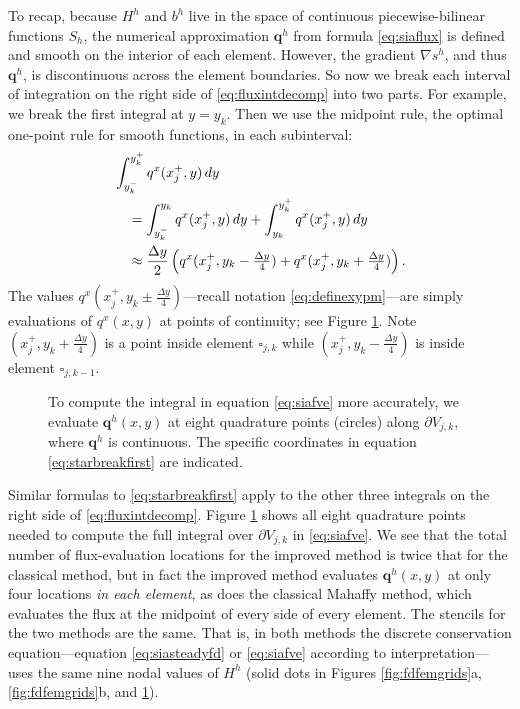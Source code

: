 \documentclass[twocolumn,letterpaper]{igs}
\newcommand\bq{\mathbf{q}}
\newcommand{\grad}{\nabla}
\begin{document}
To recap, because $H^h$ and $b^h$ live in the space of continuous piecewise-bilinear functions $S_h$, the numerical approximation $\bq^h$ from formula \eqref{eq:siaflux} is defined and smooth on the interior of each element.  However, the gradient $\grad s^h$, and thus $\bq^h$, is discontinuous across the element boundaries.  So now we break each interval of integration on the right side of \eqref{eq:fluxintdecomp} into two parts.  For example, we break the first integral at $y=y_k$.  Then we use the midpoint rule, the optimal one-point rule for smooth functions, in each subinterval:
\begin{align}
&\int_{y_k^-}^{y_k^+} q^x(x_j^+,y)\,dy  \label{eq:starbreakfirst} \\
  &\quad= \int_{y_k^-}^{y_k} q^x(x_j^+,y)\,dy + \int_{y_k}^{y_k^+} q^x(x_j^+,y)\,dy \notag \\
  &\quad\approx \frac{\Delta y}{2} \left(q^x(x_j^+,y_k-\tfrac{\Delta y}{4}) + q^x(x_j^+,y_k+\tfrac{\Delta y}{4})\right). \notag
\end{align}
The values $q^x(x_j^+,y_k\pm\tfrac{\Delta y}{4})$---recall notation \eqref{eq:definexypm}---are simply evaluations of $q^x(x,y)$ at points of continuity; see Figure \ref{fig:improvequadrature}.  Note $(x_j^+,y_k+\tfrac{\Delta y}{4})$ is a point inside element $\square_{j,k}$ while $(x_j^+,y_k-\tfrac{\Delta y}{4})$ is inside element $\square_{j,k-1}$.  

\begin{figure}[ht]
\begin{center}

\end{center}
\caption{To compute the integral in equation \eqref{eq:siafve} more accurately, we evaluate $\bq^h(x,y)$ at eight quadrature points (circles) along $\partial V_{j,k}$, where $\bq^h$ is continuous.  The specific coordinates in equation \eqref{eq:starbreakfirst} are indicated.}
\label{fig:improvequadrature}
\end{figure}

Similar formulas to \eqref{eq:starbreakfirst} apply to the other three integrals on the right side of \eqref{eq:fluxintdecomp}.  Figure \ref{fig:improvequadrature} shows all eight quadrature points needed to compute the full integral over $\partial V_{j,k}$ in \eqref{eq:siafve}.  We see that the total number of flux-evaluation locations for the improved method is twice that for the classical method, but in fact the improved method evaluates $\bq^h(x,y)$ at only four locations \emph{in each element}, as does the classical Mahaffy method, which evaluates the flux at the midpoint of every side of every element.  The stencils for the two methods are the same.  That is, in both methods the discrete conservation equation---equation \eqref{eq:siasteadyfd} or \eqref{eq:siafve} according to interpretation---uses the same nine nodal values of $H^h$ (solid dots in Figures \ref{fig:fdfemgrids}a, \ref{fig:fdfemgrids}b, and \ref{fig:improvequadrature}).
\end{document}

